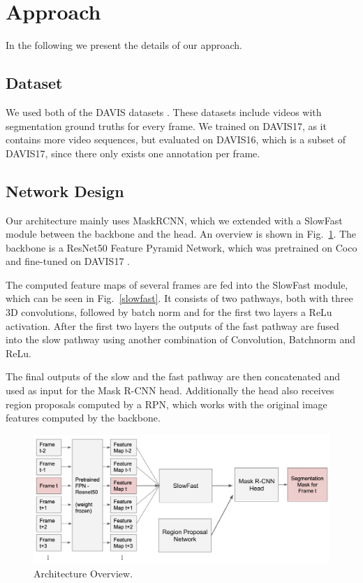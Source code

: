 \section{Approach}
In the following we present the details of our approach.
\subsection{Dataset}
We used both of the DAVIS datasets \cite{davis_2016, davis_2017}. These datasets include videos with segmentation ground truths for every frame. We trained on DAVIS17, as it contains more video sequences, but evaluated on DAVIS16, which is a subset of DAVIS17, since there only exists one annotation per frame. %
\subsection{Network Design}
Our architecture mainly uses MaskRCNN, which we extended with a SlowFast module between the backbone and the head. An overview is shown in   Fig.~\ref{architecture}. The backbone is a ResNet50 Feature Pyramid Network, which was pretrained on Coco %
and fine-tuned on DAVIS17 \cite{davis_2017}.

The computed feature maps of several frames are fed into the SlowFast module, which can be seen in Fig.~\ref{slowfast}. It consists of two pathways, both with three 3D convolutions, followed by batch norm and for the first two layers a ReLu activation. After the first two layers the outputs of the fast pathway are fused into the slow pathway using another combination of Convolution, Batchnorm and ReLu.

The final outputs of the slow and the fast pathway are then concatenated and used as input for the Mask R-CNN head. Additionally the head also receives region proposals computed by a RPN, which works with the original image features computed by the backbone.

\begin{figure}
	\centering
	\includegraphics[width=\columnwidth]{figures/architecture.png}
	\caption{Architecture Overview.}
	\label{architecture}
\end{figure}

